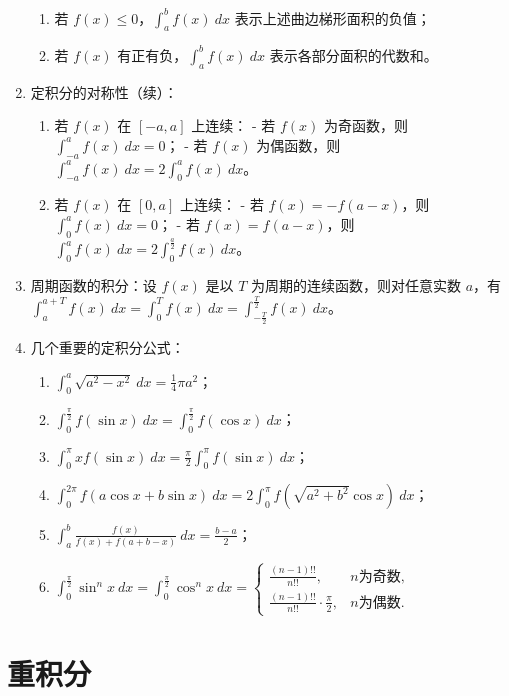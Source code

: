\documentclass[UTF8]{ctexart}
\theoremstyle{remark}
\begin{document}
\begin{enumerate}
\begin{enumerate}
		\item 若 \(f(x) \leq 0\)，\(\int_{a}^{b} f(x)\ dx\) 表示上述曲边梯形面积的负值；    
		\item 若 \(f(x)\) 有正有负，\(\int_{a}^{b} f(x)\ dx\) 表示各部分面积的代数和。    
	\end{enumerate}    
	\item 定积分的对称性（续）：    
	\begin{enumerate}
		\item 若 \(f(x)\) 在 \([-a, a]\) 上连续：    
		- 若 \(f(x)\) 为奇函数，则 \(\int_{-a}^{a} f(x)\ dx = 0\)；    
		- 若 \(f(x)\) 为偶函数，则 \(\int_{-a}^{a} f(x)\ dx = 2\int_{0}^{a} f(x)\ dx\)。    
		\item 若 \(f(x)\) 在 \([0, a]\) 上连续：    
		- 若 \(f(x) = -f(a - x)\)，则 \(\int_{0}^{a} f(x)\ dx = 0\)；    
		- 若 \(f(x) = f(a - x)\)，则 \(\int_{0}^{a} f(x)\ dx = 2\int_{0}^{\frac{a}{2}} f(x)\ dx\)。    
	\end{enumerate}    
	\item 周期函数的积分：设 \(f(x)\) 是以 \(T\) 为周期的连续函数，则对任意实数 \(a\)，有 \(\int_{a}^{a+T} f(x)\ dx = \int_{0}^{T} f(x)\ dx = \int_{-\frac{T}{2}}^{\frac{T}{2}} f(x)\ dx\)。    
	\item 几个重要的定积分公式：    
	\begin{enumerate}
		\item \(\int_{0}^{a} \sqrt{a^2 - x^2}\ dx = \frac{1}{4}\pi a^2\)；    
		\item \(\int_{0}^{\frac{\pi}{2}} f(\sin x)\ dx = \int_{0}^{\frac{\pi}{2}} f(\cos x)\ dx\)；    
		\item \(\int_{0}^{\pi} x f(\sin x)\ dx = \frac{\pi}{2} \int_{0}^{\pi} f(\sin x)\ dx\)；    
		\item \(\int_{0}^{2\pi} f(a\cos x + b\sin x)\ dx = 2\int_{0}^{\pi} f\left(\sqrt{a^2 + b^2}\cos x\right)\ dx\)；    
		\item \(\int_{a}^{b} \frac{f(x)}{f(x) + f(a + b - x)}\ dx = \frac{b - a}{2}\)；    
		\item \(\int_{0}^{\frac{\pi}{2}} \sin^n x\ dx = \int_{0}^{\frac{\pi}{2}} \cos^n x\ dx = 
		\begin{cases} 
			\frac{(n-1)!!}{n!!}, & n \text{为奇数}, \\
			\frac{(n-1)!!}{n!!} \cdot \frac{\pi}{2}, & n \text{为偶数}.
		\end{cases}\)    
	\end{enumerate}
		\end{enumerate}
		
	\section{重积分}
\end{document}
